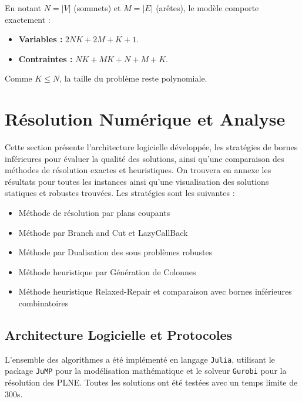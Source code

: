 \documentclass{article}
\begin{document}
En notant $N=|V|$ (sommets) et $M=|E|$ (arêtes), le modèle comporte exactement :
\begin{itemize}
    \item \textbf{Variables :} $2NK + 2M + K + 1$.
    \item \textbf{Contraintes :} $NK + MK + N + M + K$.
\end{itemize}
Comme $K \leq N$, la taille du problème reste polynomiale.

\section{Résolution Numérique et Analyse}

Cette section présente l'architecture logicielle développée, les stratégies de bornes inférieures pour évaluer la qualité des solutions, ainsi qu'une comparaison des méthodes de résolution exactes et heuristiques. On trouvera en annexe les résultats pour toutes les instances ainsi qu'une visualisation des solutions statiques et robustes trouvées. 
Les stratégies sont les suivantes :
\begin{itemize}
    \item Méthode de résolution par plans coupants
    \item Méthode par Branch and Cut et LazyCallBack
    \item Méthode par Dualisation des sous problèmes robustes
    \item Méthode heuristique par Génération de Colonnes
    \item Méthode heuristique Relaxed-Repair et comparaison avec bornes inférieures combinatoires
\end{itemize}

\subsection{Architecture Logicielle et Protocoles}

L'ensemble des algorithmes a été implémenté en langage \texttt{Julia}, utilisant le package \texttt{JuMP} pour la modélisation mathématique et le solveur \texttt{Gurobi} pour la résolution des PLNE. Toutes les solutions ont été testées avec un temps limite de 300s.
\end{document}
